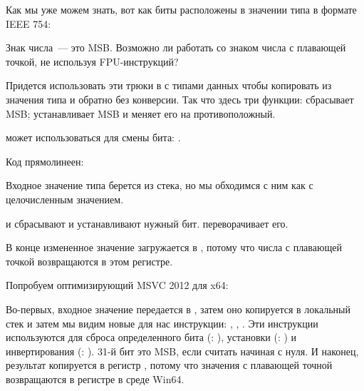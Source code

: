 
Как мы уже можем знать, вот как биты расположены в значении типа \Tfloat в формате IEEE 754:



Знак числа~--- это \ac{MSB}. 
Возможно ли работать со знаком числа с плавающей точкой, не используя FPU-инструкций?



Придется использовать эти трюки в \CCpp с типами данных чтобы копировать из значения типа \Tfloat и обратно
без конверсии.
Так что здесь три функции:  сбрасывает \ac{MSB};  устанавливает \ac{MSB} и 
 меняет его на противоположный.

\XOR может использоваться для смены бита: .


Код прямолинеен:



Входное значение типа \Tfloat берется из стека, но мы обходимся с ним как с целочисленным значением.

\AND и \OR сбрасывают и устанавливают нужный бит.
\XOR переворачивает его.

В конце измененное значение загружается в , потому что числа с плавающей точкой возвращаются в этом регистре.

Попробуем оптимизирующий MSVC 2012 для x64:



Во-первых, входное значение передается в , затем оно копируется в локальный стек и затем мы видим
новые для нас инструкции: \BTR, \BTS, \BTC.
Эти инструкции используются для сброса определенного бита (\BTR: ), 
установки (\BTS: ) и инвертирования (\BTC: ).
31-й бит это \ac{MSB}, если считать начиная с нуля.
И наконец, результат копируется в регистр , потому что значения с плавающей точной возвращаются
в регистре  в среде Win64.


